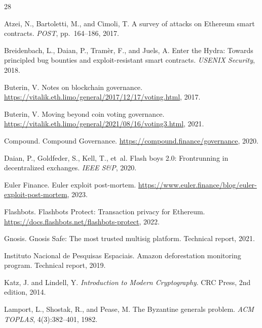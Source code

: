 \documentclass[11pt,letterpaper]{article}
\begin{document}
\begin{thebibliography}{28}

Atzei, N., Bartoletti, M., and Cimoli, T.
\newblock A survey of attacks on Ethereum smart contracts.
\newblock \emph{POST}, pp.~164--186, 2017.

Breidenbach, L., Daian, P., Tram{\`e}r, F., and Juels, A.
\newblock Enter the Hydra: Towards principled bug bounties and exploit-resistant smart contracts.
\newblock \emph{USENIX Security}, 2018.

Buterin, V.
\newblock Notes on blockchain governance.
\newblock \url{https://vitalik.eth.limo/general/2017/12/17/voting.html}, 2017.

Buterin, V.
\newblock Moving beyond coin voting governance.
\newblock \url{https://vitalik.eth.limo/general/2021/08/16/voting3.html}, 2021.

Compound.
\newblock Compound Governance.
\newblock \url{https://compound.finance/governance}, 2020.

Daian, P., Goldfeder, S., Kell, T., et~al.
\newblock Flash boys 2.0: Frontrunning in decentralized exchanges.
\newblock \emph{IEEE S\&P}, 2020.

Euler Finance.
\newblock Euler exploit post-mortem.
\newblock \url{https://www.euler.finance/blog/euler-exploit-post-mortem}, 2023.

Flashbots.
\newblock Flashbots Protect: Transaction privacy for Ethereum.
\newblock \url{https://docs.flashbots.net/flashbots-protect}, 2022.

Gnosis.
\newblock Gnosis Safe: The most trusted multisig platform.
\newblock Technical report, 2021.

Instituto Nacional de Pesquisas Espaciais.
\newblock Amazon deforestation monitoring program.
\newblock Technical report, 2019.

Katz, J. and Lindell, Y.
\newblock \emph{Introduction to Modern Cryptography}.
\newblock CRC Press, 2nd edition, 2014.

Lamport, L., Shostak, R., and Pease, M.
\newblock The Byzantine generals problem.
\newblock \emph{ACM TOPLAS}, 4(3):382--401, 1982.


\end{thebibliography}
\end{document}
